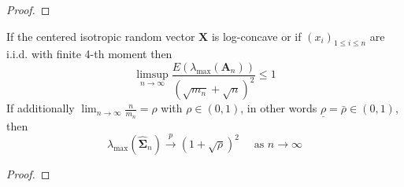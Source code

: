\begin{proof}

\end{proof}

\begin{theorem}
    If the centered isotropic random vector $\mathbf{X}$ is log-concave or if $\left(x_{i}\right)_{1\leq i\leq n}$ are i.i.d. with finite 4-th moment then
    \begin{equation}
        \limsup_{n\rightarrow\infty}\frac{E\left(\lambda_{\max}\left(\mathbf{A}_{n}\right)\right)}{\left(\sqrt{m_{n}}+\sqrt{n}\right)^{2}}\leq 1
    \end{equation}
    If additionally $\lim_{n\rightarrow\infty}\frac{n}{m_{n}}=\rho$ with $\rho \in(0,1)$, in other words $\underline{\rho}=\bar{\rho}\in(0,1)$, then
    \begin{equation}
        \lambda_{\max}\left(\widehat{\boldsymbol{\Sigma}}_{n}\right)\stackrel{p}{\longrightarrow}(1+\sqrt{\rho})^{2}\quad\text{ as }n\rightarrow\infty
    \end{equation}
\end{theorem}

\begin{proof}

\end{proof}